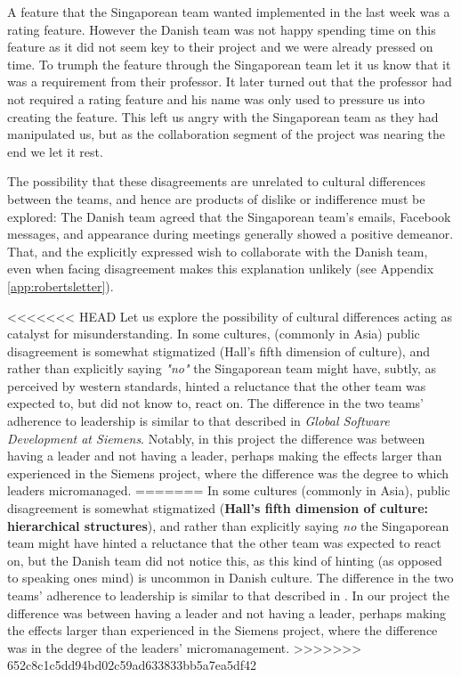 A feature that the Singaporean team wanted implemented in the last week was
a rating feature. However the Danish team was not happy spending time on this
feature as it did not seem key to their project and we were already pressed on 
time. To trumph the feature through the Singaporean team let it us know
that it was a requirement from their professor. It later turned out that the
professor had not required a rating feature and his name was only used
to pressure us into creating the feature. This left us angry with the 
Singaporean team as they had manipulated us, but as the collaboration
segment of the project was nearing the end we let it rest.

The possibility that these disagreements are unrelated to cultural differences
between the teams, and hence are products of dislike or indifference must be
explored: The Danish team agreed that the Singaporean team's emails, Facebook
messages, and appearance during meetings generally showed a positive demeanor.
That, and the explicitly expressed wish to collaborate with the Danish team,
even when facing disagreement makes this explanation unlikely (see Appendix
\ref{app:robertsletter}).

<<<<<<< HEAD
Let us explore the possibility of cultural differences acting as catalyst for
misunderstanding. In some cultures, (commonly in Asia) public disagreement is
somewhat stigmatized (Hall's fifth dimension of
culture)\cite{surprises}\cite{herbsiemens}, and rather than explicitly saying
\emph{"no"} the Singaporean team might have, subtly, as perceived by western
standards, hinted a reluctance that the other team was expected to, but did not
know to, react on.  The difference in the two teams' adherence to leadership is
similar to that described in \emph{Global Software Development at
Siemens}\cite{herbsiemens}. Notably, in this project the difference was between
having a leader and not having a leader, perhaps making the effects larger than
experienced in the Siemens project, where the difference was the degree to which
leaders micromanaged.
=======
In some cultures (commonly in Asia), public disagreement is
somewhat stigmatized (\textbf{Hall's fifth dimension of culture: hierarchical
structures})\cite{surprises}\cite{herbsiemens}, and rather
than explicitly saying \emph{no} the Singaporean team might have hinted a
reluctance that the other team was expected to react on, but the Danish team
did not notice this, as this kind of hinting (as opposed to speaking ones mind)
is uncommon in Danish culture.
The difference in the two teams' adherence to leadership is similar to that
described in \cite{herbsiemens}. In our project the difference was
between having a leader and not having a leader, perhaps making the effects
larger than experienced in the Siemens project, where the difference was in the
degree of the leaders' micromanagement.
>>>>>>> 652c8c1c5dd94bd02c59ad633833bb5a7ea5df42

